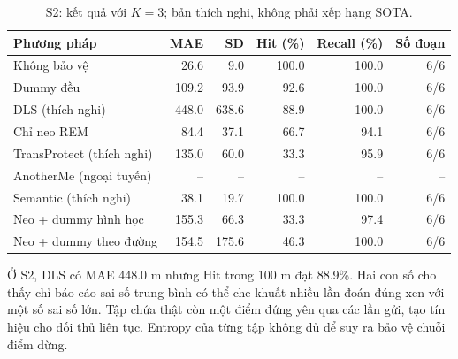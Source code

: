 \begin{table}[H]\centering\small

\setlength{\tabcolsep}{4pt}

\caption{S2: kết quả với $K=3$; bản thích nghi, không phải xếp hạng SOTA.}

\begin{tabular}{p{5.0cm}rrrrr}\toprule

Phương pháp & MAE & SD & Hit (\%) & Recall (\%) & Số đoạn\\\midrule

Không bảo vệ & 26.6 & 9.0 & 100.0 & 100.0 & 6/6\\

Dummy đều & 109.2 & 93.9 & 92.6 & 100.0 & 6/6\\

DLS (thích nghi) & 448.0 & 638.6 & 88.9 & 100.0 & 6/6\\

Chỉ neo REM & 84.4 & 37.1 & 66.7 & 94.1 & 6/6\\

TransProtect (thích nghi) & 135.0 & 60.0 & 33.3 & 95.9 & 6/6\\

AnotherMe (ngoại tuyến) & -- & -- & -- & -- & --\\

Semantic (thích nghi) & 38.1 & 19.7 & 100.0 & 100.0 & 6/6\\

Neo + dummy hình học & 155.3 & 66.3 & 33.3 & 97.4 & 6/6\\

Neo + dummy theo đường & 154.5 & 175.6 & 46.3 & 100.0 & 6/6\\

\bottomrule\end{tabular}\end{table}

Ở S2, DLS có MAE 448.0 m nhưng Hit trong 100 m đạt 88.9\%. Hai con số cho thấy chỉ báo cáo sai số trung bình có thể che khuất nhiều lần đoán đúng xen với một số sai số lớn. Tập chứa thật còn một điểm đứng yên qua các lần gửi, tạo tín hiệu cho đối thủ liên tục. Entropy của từng tập không đủ để suy ra bảo vệ chuỗi điểm dừng.

